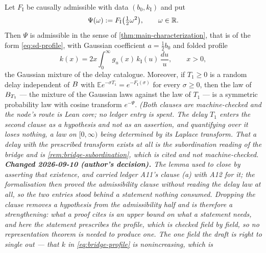 \begin{lemma}\label{lem:bridge-exponents}
\leanok
Let $F_{\mathrm I}$ be causally admissible with data $(b_0, k_{\mathrm I})$ and put
\begin{equation}\label{eq:bridge}
  \Psi(\omega) := F_{\mathrm I}\bigl(\tfrac12\omega^2\bigr), \qquad \omega \in \mathbb{R} .
\end{equation}
Then $\Psi$ is admissible in the sense of \ref{thm:main-characterization}, that is of the form
\ref{eq:sd-profile}, with Gaussian coefficient $a = \tfrac12 b_0$ and folded profile
\begin{equation}\label{eq:bridge-profile}
  k(x) = 2x\int_0^\infty g_u(x)\,k_{\mathrm I}(u)\,\frac{du}{u}, \qquad x > 0,
\end{equation}
the Gaussian mixture of the delay catalogue. Moreover, if $T_1 \ge 0$ is a random delay
independent of $B$ with $\mathbb{E}e^{-\sigma T_1} = e^{-F_{\mathrm I}(\sigma)}$ for every
$\sigma \ge 0$, then the law of $B_{T_1}$ --- the mixture of the Gaussian laws against the law
of $T_1$ --- is a symmetric probability law with cosine transform $e^{-\Psi}$.
\statusT\quad\emph{(Both clauses are machine-checked and the node's route is Lean core; no
ledger entry is spent. The delay $T_1$ enters the second clause as a \emph{hypothesis} and not
as an assertion, and quantifying over it loses nothing, a law on $[0,\infty)$ being determined
by its Laplace transform. That a delay with the prescribed transform exists at all is the
subordination reading of the bridge and is \ref{rem:bridge-subordination}, which is cited and
not machine-checked. \textbf{Changed 2026-09-10 (author's decision).} The lemma used to close
by asserting that existence, and carried ledger A11's clause (a) with A12 for it; the
formalisation then proved the admissibility clause without reading the delay law at all, so the
two entries stood behind a statement nothing consumed. Dropping the clause removes a hypothesis
from the admissibility half and is therefore a strengthening: what a proof cites is an upper
bound on what a statement needs, and here the statement \emph{prescribes} the profile, which is
checked field by field, so no representation theorem is needed to produce one. The one field the
draft is right to single out --- that $k$ in \ref{eq:bridge-profile} is nonincreasing, which is
}
\end{lemma}

